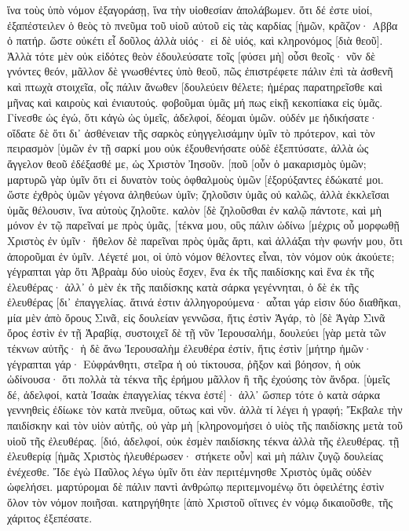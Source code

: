ἵνα τοὺς ὑπὸ νόμον ἐξαγοράσῃ, ἵνα τὴν υἱοθεσίαν ἀπολάβωμεν. 
ὅτι δέ ἐστε υἱοί, ἐξαπέστειλεν ὁ θεὸς τὸ πνεῦμα τοῦ υἱοῦ αὐτοῦ εἰς τὰς καρδίας [ἡμῶν, κρᾶζον· Αββα ὁ πατήρ. 
ὥστε οὐκέτι εἶ δοῦλος ἀλλὰ υἱός· εἰ δὲ υἱός, καὶ κληρονόμος [διὰ θεοῦ]. 
Ἀλλὰ τότε μὲν οὐκ εἰδότες θεὸν ἐδουλεύσατε τοῖς [φύσει μὴ] οὖσι θεοῖς· 
νῦν δὲ γνόντες θεόν, μᾶλλον δὲ γνωσθέντες ὑπὸ θεοῦ, πῶς ἐπιστρέφετε πάλιν ἐπὶ τὰ ἀσθενῆ καὶ πτωχὰ στοιχεῖα, οἷς πάλιν ἄνωθεν [δουλεύειν θέλετε; 
ἡμέρας παρατηρεῖσθε καὶ μῆνας καὶ καιροὺς καὶ ἐνιαυτούς. 
φοβοῦμαι ὑμᾶς μή πως εἰκῇ κεκοπίακα εἰς ὑμᾶς. 
Γίνεσθε ὡς ἐγώ, ὅτι κἀγὼ ὡς ὑμεῖς, ἀδελφοί, δέομαι ὑμῶν. οὐδέν με ἠδικήσατε· 
οἴδατε δὲ ὅτι δι᾽ ἀσθένειαν τῆς σαρκὸς εὐηγγελισάμην ὑμῖν τὸ πρότερον, 
καὶ τὸν πειρασμὸν [ὑμῶν ἐν τῇ σαρκί μου οὐκ ἐξουθενήσατε οὐδὲ ἐξεπτύσατε, ἀλλὰ ὡς ἄγγελον θεοῦ ἐδέξασθέ με, ὡς Χριστὸν Ἰησοῦν. 
[ποῦ [οὖν ὁ μακαρισμὸς ὑμῶν; μαρτυρῶ γὰρ ὑμῖν ὅτι εἰ δυνατὸν τοὺς ὀφθαλμοὺς ὑμῶν [ἐξορύξαντες ἐδώκατέ μοι. 
ὥστε ἐχθρὸς ὑμῶν γέγονα ἀληθεύων ὑμῖν; 
ζηλοῦσιν ὑμᾶς οὐ καλῶς, ἀλλὰ ἐκκλεῖσαι ὑμᾶς θέλουσιν, ἵνα αὐτοὺς ζηλοῦτε. 
καλὸν [δὲ ζηλοῦσθαι ἐν καλῷ πάντοτε, καὶ μὴ μόνον ἐν τῷ παρεῖναί με πρὸς ὑμᾶς, 
[τέκνα μου, οὓς πάλιν ὠδίνω [μέχρις οὗ μορφωθῇ Χριστὸς ἐν ὑμῖν· 
ἤθελον δὲ παρεῖναι πρὸς ὑμᾶς ἄρτι, καὶ ἀλλάξαι τὴν φωνήν μου, ὅτι ἀποροῦμαι ἐν ὑμῖν. 
Λέγετέ μοι, οἱ ὑπὸ νόμον θέλοντες εἶναι, τὸν νόμον οὐκ ἀκούετε; 
γέγραπται γὰρ ὅτι Ἀβραὰμ δύο υἱοὺς ἔσχεν, ἕνα ἐκ τῆς παιδίσκης καὶ ἕνα ἐκ τῆς ἐλευθέρας· 
ἀλλ᾽ ὁ μὲν ἐκ τῆς παιδίσκης κατὰ σάρκα γεγέννηται, ὁ δὲ ἐκ τῆς ἐλευθέρας [δι᾽ ἐπαγγελίας. 
ἅτινά ἐστιν ἀλληγορούμενα· αὗται γάρ εἰσιν δύο διαθῆκαι, μία μὲν ἀπὸ ὄρους Σινᾶ, εἰς δουλείαν γεννῶσα, ἥτις ἐστὶν Ἁγάρ, 
τὸ [δὲ Ἁγὰρ Σινᾶ ὄρος ἐστὶν ἐν τῇ Ἀραβίᾳ, συστοιχεῖ δὲ τῇ νῦν Ἰερουσαλήμ, δουλεύει [γὰρ μετὰ τῶν τέκνων αὐτῆς· 
ἡ δὲ ἄνω Ἰερουσαλὴμ ἐλευθέρα ἐστίν, ἥτις ἐστὶν [μήτηρ ἡμῶν· 
γέγραπται γάρ· Εὐφράνθητι, στεῖρα ἡ οὐ τίκτουσα, ῥῆξον καὶ βόησον, ἡ οὐκ ὠδίνουσα· ὅτι πολλὰ τὰ τέκνα τῆς ἐρήμου μᾶλλον ἢ τῆς ἐχούσης τὸν ἄνδρα. 
[ὑμεῖς δέ, ἀδελφοί, κατὰ Ἰσαὰκ ἐπαγγελίας τέκνα ἐστέ]· 
ἀλλ᾽ ὥσπερ τότε ὁ κατὰ σάρκα γεννηθεὶς ἐδίωκε τὸν κατὰ πνεῦμα, οὕτως καὶ νῦν. 
ἀλλὰ τί λέγει ἡ γραφή; Ἔκβαλε τὴν παιδίσκην καὶ τὸν υἱὸν αὐτῆς, οὐ γὰρ μὴ [κληρονομήσει ὁ υἱὸς τῆς παιδίσκης μετὰ τοῦ υἱοῦ τῆς ἐλευθέρας. 
[διό, ἀδελφοί, οὐκ ἐσμὲν παιδίσκης τέκνα ἀλλὰ τῆς ἐλευθέρας. 
τῇ ἐλευθερίᾳ [ἡμᾶς Χριστὸς ἠλευθέρωσεν· στήκετε οὖν] καὶ μὴ πάλιν ζυγῷ δουλείας ἐνέχεσθε. 
Ἴδε ἐγὼ Παῦλος λέγω ὑμῖν ὅτι ἐὰν περιτέμνησθε Χριστὸς ὑμᾶς οὐδὲν ὠφελήσει. 
μαρτύρομαι δὲ πάλιν παντὶ ἀνθρώπῳ περιτεμνομένῳ ὅτι ὀφειλέτης ἐστὶν ὅλον τὸν νόμον ποιῆσαι. 
κατηργήθητε [ἀπὸ Χριστοῦ οἵτινες ἐν νόμῳ δικαιοῦσθε, τῆς χάριτος ἐξεπέσατε. 
